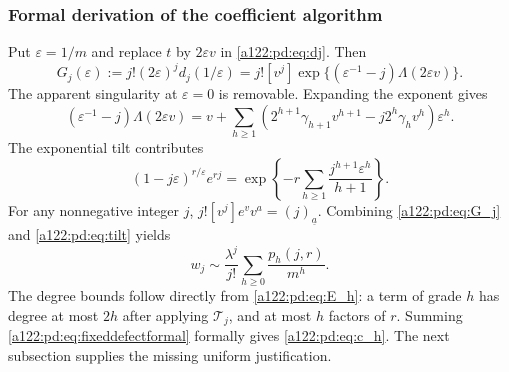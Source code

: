 \documentclass[11pt,letterpaper]{article}
\numberwithin{equation}{subsection}
\theoremstyle{definition}
\theoremstyle{remark}
\theoremstyle{plain}
\newcommand{\fall}[2]{(#1)_{\underline{#2}}}
\newcommand{\coeff}[2]{[#1^{#2}]}
\newcommand{\cT}{\mathcal T}
\begin{document}
\subsubsection{Formal derivation of the coefficient algorithm}
Put $\varepsilon=1/m$ and replace $t$ by $2\varepsilon v$ in
\eqref{a122:pd:eq:dj}. Then
\begin{equation}\label{a122:pd:eq:G_j}
 G_j(\varepsilon):=j!(2\varepsilon)^j d_j(1/\varepsilon)
 =j!\coeff{v}{j}
 \exp\{(\varepsilon^{-1}-j)\Lambda(2\varepsilon v)\}.
\end{equation}
The apparent singularity at $\varepsilon=0$ is removable. Expanding the
exponent gives
\[
 (\varepsilon^{-1}-j)\Lambda(2\varepsilon v)
 =v+\sum_{h\ge1}
 (2^{h+1}\gamma_{h+1}v^{h+1}-j2^h\gamma_h v^h)\varepsilon^h.
\]
The exponential tilt contributes
\begin{equation}\label{a122:pd:eq:tilt}
 (1-j\varepsilon)^{r/\varepsilon}e^{rj}
 =\exp\!\left\{-r\sum_{h\ge1}
           \frac{j^{h+1}\varepsilon^h}{h+1}\right\}.
\end{equation}
For any nonnegative integer $j$,
$j!\coeff{v}{j}e^v v^a=\fall{j}{a}$.
Combining \eqref{a122:pd:eq:G_j} and \eqref{a122:pd:eq:tilt} yields
\begin{equation}\label{a122:pd:eq:fixeddefectformal}
 w_j\sim\frac{\lambda^j}{j!}
 \sum_{h\ge0}\frac{p_h(j,r)}{m^h}.
\end{equation}
The degree bounds follow directly from \eqref{a122:pd:eq:E_h}:
a term of grade $h$ has degree at most $2h$ after applying $\cT_j$,
and at most $h$ factors of $r$.
Summing \eqref{a122:pd:eq:fixeddefectformal} formally gives \eqref{a122:pd:eq:c_h}.
The next subsection supplies the missing uniform justification.
\end{document}
